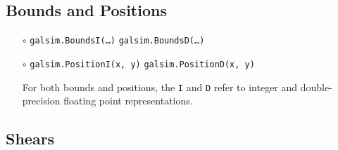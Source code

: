 \documentclass[preprint,11pt]{../../devel/modules/aastex}
\begin{document}
\subsection{Bounds and Positions}\label{sect:bounds}

\begin{itemize}

\item[$\circ$] \texttt{galsim.BoundsI(\dots)} \newline
  \texttt{galsim.BoundsD(\dots)} 

\item[$\circ$] \texttt{galsim.PositionI(x, y)} \newline
  \texttt{galsim.PositionD(x, y)} 

For both bounds and positions, the \texttt{I} and \texttt{D} refer to
integer and double-precision floating point representations.

\end{itemize}

\subsection{Shears}\label{sect:shears}
\end{document}
